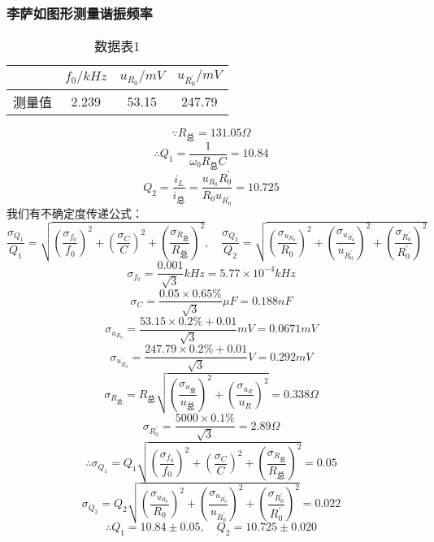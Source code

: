 \documentclass[a4 paper,12pt]{article}
\begin{document}
\subsubsection{李萨如图形测量谐振频率}
\begin{table}[H]
	\centering
	\caption{数据表1}
	\label{数据表1}
	\begin{tabular}{c|*{3}{c}}
		\toprule[0.5mm]
		&$f_{0}/kHz$&$u_{R_{0}}/mV$&$u_{R_{0}^{\prime}}/mV$\\
		\midrule
		测量值&2.239&53.15&247.79\\
		\bottomrule[0.5mm]
	\end{tabular}
\end{table}
$$\because R_{\text{总}}=131.05\Omega$$
$$\therefore Q_{1}=\dfrac{1}{\omega_{0}R_{\text{总}}C}=10.84$$
$$Q_{2}=\dfrac{i_{L}}{i_{\text{总}}}=\dfrac{u_{R_{0}}R_{0}^{\prime}}{R_{0}u_{R_{0}^{\prime}}}=10.725$$
我们有不确定度传递公式：$\dfrac{\sigma_{Q_{1}}}{Q_{1}}=\sqrt{(\dfrac{\sigma_{f_{0}}}{f_{0}})^{2}+(\dfrac{\sigma_{C}}{C})^{2}+(\dfrac{\sigma_{R_{\text{总}}}}{R_{\text{总}}})^{2}},\quad \dfrac{\sigma_{Q_{2}}}{Q_{2}}=\sqrt{(\dfrac{\sigma_{u_{R_{0}}}}{R_{0}})^{2}+(\dfrac{\sigma_{u_{R_{0}^{\prime}}}}{u_{R_{0}^{\prime}}})^{2}+(\dfrac{\sigma_{R_{0}^{\prime}}}{R_{0}^{\prime}})^{2}}$\\
$$\sigma_{f_{0}}=\dfrac{0.001}{\sqrt{3}}kHz=5.77\times10^{-4}kHz$$
$$\sigma_{C}=\dfrac{0.05\times 0.65\%}{\sqrt{3}}\mu F=0.188nF $$
$$\sigma_{u_{R_{0}}}=\dfrac{53.15\times 0.2\%+0.01}{\sqrt{3}}mV=0.0671mV$$
$$\sigma_{u_{R_{0}^{\prime}}}=\dfrac{247.79\times 0.2\%+0.01}{\sqrt{3}}V=0.292mV$$
$$\sigma_{R_{\text{总}}}=R_{\text{总}}\sqrt{(\dfrac{\sigma_{u_{\text{总}}}}{u_{\text{总}}})^{2}+(\dfrac{\sigma_{u_{R}}}{u_{R}})^{2}}=0.338\Omega$$
$$\sigma_{R_{0}^{\prime}}=\dfrac{5000\times0.1\%}{\sqrt{3}}=2.89\Omega$$
$$\therefore \sigma_{Q_{1}}=Q_{1}\sqrt{(\dfrac{\sigma_{f_{0}}}{f_{0}})^{2}+(\dfrac{\sigma_{C}}{C})^{2}+(\dfrac{\sigma_{R_{\text{总}}}}{R_{\text{总}}})^{2}}=0.05$$
$$\sigma_{Q_{2}}=Q_{2}\sqrt{(\dfrac{\sigma_{u_{R_{0}}}}{R_{0}})^{2}+(\dfrac{\sigma_{u_{R_{0}^{\prime}}}}{u_{R_{0}^{\prime}}})^{2}+(\dfrac{\sigma_{R_{0}^{\prime}}}{R_{0}^{\prime}})^{2}}=0.022$$
$$\therefore Q_{1}=10.84\pm0.05,\quad Q_{2}=10.725\pm0.020$$
\end{document}

